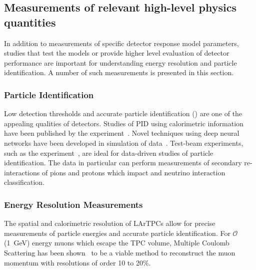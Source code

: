 \subsection{Measurements of relevant high-level physics quantities}
In addition to measurements of specific detector response model parameters, studies that test the models or provide higher level evaluation of detector performance are important for understanding energy resolution and particle identification. A number of such measurements is presented in this section.

\subsubsection{Particle Identification}
Low detection thresholds and accurate particle identification () are one of the appealing qualities of  detectors. Studies of PID using calorimetric information have been published by the \argoneut experiment~\cite{Acciarri:2013met}. Novel techniques using deep neural networks have been developed in simulation of  data~\cite{Acciarri:2016ryt}. Test-beam experiments, such as the \lariat experiment~\cite{Cavanna:2014iqa}, are ideal for data-driven studies of particle identification. The \lariat data in particular can perform measurements of secondary re-interactions of pions and protons which impact  and neutrino interaction classification.

\subsubsection{Energy Resolution Measurements}
The spatial and calorimetric resolution of LArTPCs allow for precise measurements of particle energies and accurate particle identification. For $\mathcal{O}$(\SI{1}{\GeV}) energy muons which escape the TPC volume, Multiple Coulomb Scattering has been shown~\cite{Ankowski:2006ts,Antonello:2016niy,Abratenko:2017nki} to be a viable method to reconstruct the muon momentum with resolutions of order \num{10} to \num{20}\%. 

